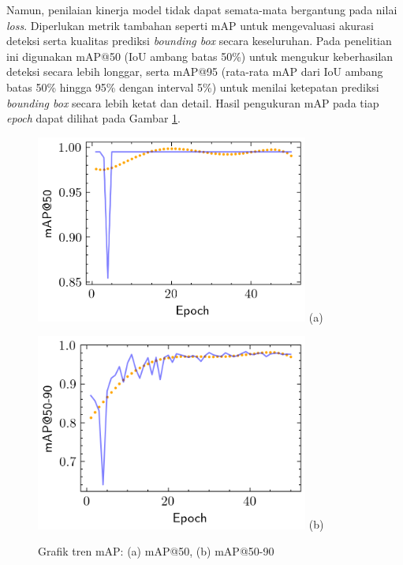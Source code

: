 Namun, penilaian kinerja model tidak dapat semata-mata bergantung
pada nilai \textit{loss}. Diperlukan metrik tambahan seperti mAP
untuk mengevaluasi akurasi deteksi serta kualitas prediksi
\textit{bounding box} secara keseluruhan. Pada penelitian ini
digunakan mAP@50 (IoU ambang batas 50\%) untuk mengukur
keberhasilan deteksi secara lebih longgar, serta mAP@95 (rata-rata
mAP dari IoU ambang batas 50\% hingga 95\% dengan interval 5\%)
untuk menilai ketepatan prediksi \textit{bounding box} secara lebih
ketat dan detail. Hasil pengukuran mAP pada tiap \textit{epoch} dapat
dilihat pada Gambar \ref{fig:map}.

\begin{figure}[H]
  \centering
  \begin{minipage}[]{\textwidth}
    \centering
    \includegraphics[width=0.8\textwidth]{gambar/map50.png}
    (a)
  \end{minipage}
  \vspace{1em}

  \begin{minipage}{\textwidth}
    \centering
    \includegraphics[width=0.8\textwidth]{gambar/map5090.png}
    (b)
  \end{minipage}
  \caption{Grafik tren mAP: (a) mAP@50, (b) mAP@50-90}
  \label{fig:map}
  \vspace{-1em}
\end{figure}

